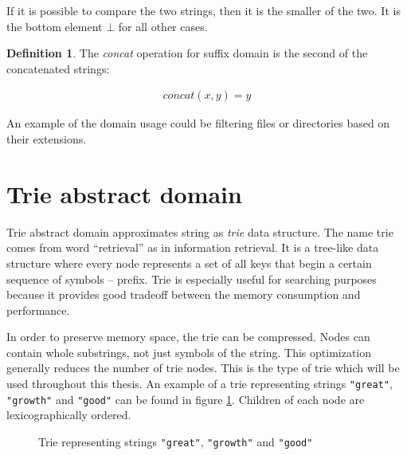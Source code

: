 \documentclass[12pt,final,oneside]{fithesis2}
\theoremstyle{definition}
\newtheorem{definition}{Definition}
\begin{document}
If it is possible to compare the two strings, then it is the smaller of the
two. It is the bottom element $\bot$ for all other cases.

\begin{definition}
\label{def:suffixstrcat}
The \textit{concat} operation for suffix domain is the second of the
concatenated strings:

\begin{align*}
\textit{concat}(x, y) = y
\end{align*}
\end{definition}

An example of the domain usage could be filtering files or directories
based on their extensions.


\section{Trie abstract domain}

Trie abstract domain approximates string as \textit{trie} data structure.
The name trie comes from word ``retrieval'' as in information retrieval. It
is a tree-like data structure where every node represents a set of all keys
that begin a certain sequence of symbols -- prefix. Trie is especially useful
for searching purposes because it provides good tradeoff between the memory
consumption and performance.

In order to preserve memory space, the trie can be compressed. Nodes can
contain whole substrings, not just symbols of the string. This optimization
generally reduces the number of trie nodes. This is the type of
trie which will be used throughout this thesis. An example of a trie
representing strings \texttt{"great"}, \texttt{"growth"} and \texttt{"good"}
can be found in figure \ref{fig:trie}. Children of each node are
lexicographically ordered.

\begin{figure}[ht]
\centering
{}
\caption{Trie representing strings \texttt{"great"}, \texttt{"growth"} and
  \texttt{"good"}}
\label{fig:trie}
\end{figure}
\end{document}
